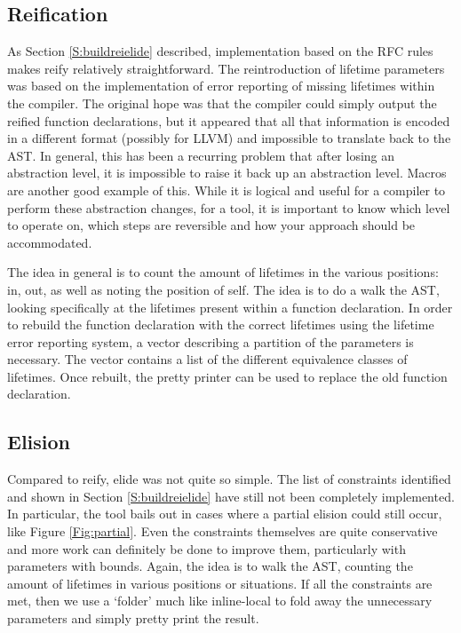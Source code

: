 \subsection{Reification}
As Section \ref{S:buildreielide} described, implementation based on the RFC rules makes reify relatively straightforward. The reintroduction of lifetime parameters was based on the implementation of error reporting of missing lifetimes within the compiler. The original hope was that the compiler could simply output the reified function declarations, but it appeared that all that information is encoded in a different format (possibly for LLVM) and impossible to translate back to the AST. In general, this has been a recurring problem that after losing an abstraction level, it is impossible to raise it back up an abstraction level. Macros are another good example of this. While it is logical and useful for a compiler to perform these abstraction changes, for a tool, it is important to know which level to operate on, which steps are reversible and how your approach should be accommodated.

The idea in general is to count the amount of lifetimes in the various positions: in, out, as well as noting the position of self. The idea is to do a walk the AST, looking specifically at the lifetimes present within a function declaration. In order to rebuild the function declaration with the correct lifetimes using the lifetime error reporting system, a vector describing a partition of the parameters is necessary. The vector contains a list of the different equivalence classes of lifetimes. Once rebuilt, the pretty printer can be used to replace the old function declaration.

\subsection{Elision}

Compared to reify, elide was not quite so simple. The list of constraints identified and shown in Section \ref{S:buildreielide} have still not been completely implemented. In particular, the tool bails out in cases where a partial elision could still occur, like Figure \ref{Fig:partial}. Even the constraints themselves are quite conservative and more work can definitely be done to improve them, particularly with parameters with bounds. Again, the idea is to walk the AST, counting the amount of lifetimes in various positions or situations. If all the constraints are met, then we use a `folder' much like inline-local to fold away the unnecessary parameters and simply pretty print the result.

